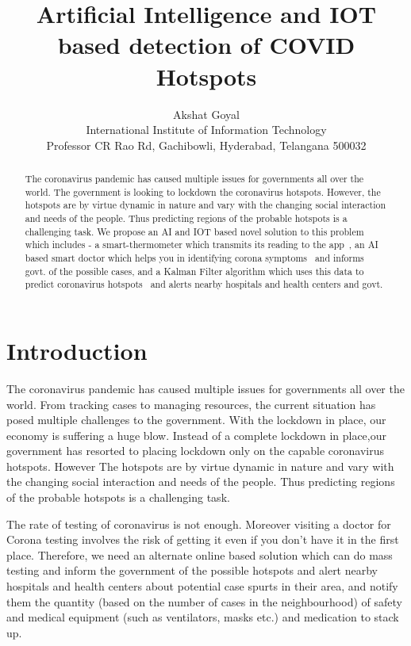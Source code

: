 \documentclass[10pt,twocolumn,letterpaper]{article}
\begin{document}
\title{Artificial Intelligence and IOT based detection of COVID Hotspots}

\author{Akshat Goyal\\
International Institute of Information Technology\\
Professor CR Rao Rd, Gachibowli, Hyderabad, Telangana 500032\\
}

\maketitle

\begin{abstract}
   The coronavirus pandemic has caused multiple issues for governments all over the world. The government is looking to lockdown the coronavirus hotspots. However, the hotspots are by virtue dynamic in nature and vary with the changing social interaction and needs of the people. Thus predicting regions of the probable hotspots is a challenging task. We propose an AI and IOT based novel solution to this problem which includes - a smart-thermometer which transmits its reading to the app~\cite{smart-thermometer}, an AI based smart doctor which helps you in identifying corona symptoms~\cite{smart-doctor} and informs govt. of the possible cases, and a Kalman Filter algorithm which uses this data to predict coronavirus hotspots~\cite{kalman-filter} and alerts nearby hospitals and health centers and govt.
\end{abstract}

\section{Introduction}

The coronavirus pandemic has caused multiple issues for governments all over the world. From tracking cases to managing resources, the current situation has posed multiple challenges to the government. With the lockdown in place, our economy is suffering a huge blow. Instead of a complete lockdown in place,our government has resorted to placing lockdown only on the capable coronavirus hotspots. However The hotspots are by virtue dynamic in nature and vary with the changing social interaction and needs of the people. Thus predicting regions of the probable hotspots is a challenging task.


The rate of testing of coronavirus is not enough. Moreover visiting a doctor for Corona testing involves the risk of getting it even if you don’t have it in the first place. Therefore, we need an alternate online based solution which can do mass testing and inform the government of the possible hotspots and alert nearby hospitals and health centers about potential case spurts in their area, and notify them the quantity (based on the number of cases in the neighbourhood) of safety and medical equipment (such as ventilators, masks etc.) and medication to stack up.
\end{document}
